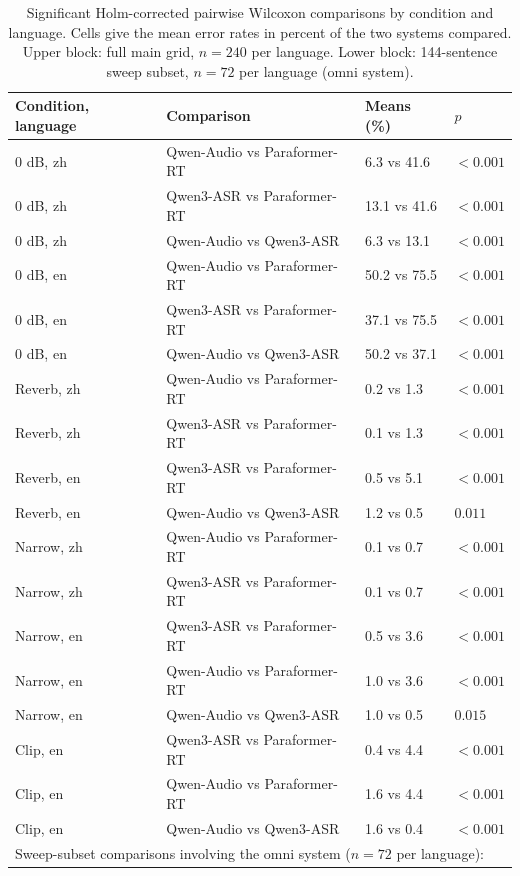 \documentclass[11pt]{article}
\begin{document}
\begin{table}[h]
\centering
\caption{Significant Holm-corrected pairwise Wilcoxon comparisons by
condition and language. Cells give the mean error rates in percent of the
two systems compared. Upper block: full main grid, $n{=}240$ per language.
Lower block: 144-sentence sweep subset, $n{=}72$ per language (omni
system).}\label{tab:pairwise}
\small
\setlength{\tabcolsep}{4pt}
\begin{tabular}{llll}
\toprule
Condition, language & Comparison & Means (\%) & $p$ \\
\midrule
0 dB, zh & Qwen-Audio vs Paraformer-RT & 6.3 vs 41.6 & $<0.001$ \\
0 dB, zh & Qwen3-ASR vs Paraformer-RT & 13.1 vs 41.6 & $<0.001$ \\
0 dB, zh & Qwen-Audio vs Qwen3-ASR & 6.3 vs 13.1 & $<0.001$ \\
0 dB, en & Qwen-Audio vs Paraformer-RT & 50.2 vs 75.5 & $<0.001$ \\
0 dB, en & Qwen3-ASR vs Paraformer-RT & 37.1 vs 75.5 & $<0.001$ \\
0 dB, en & Qwen-Audio vs Qwen3-ASR & 50.2 vs 37.1 & $<0.001$ \\
Reverb, zh & Qwen-Audio vs Paraformer-RT & 0.2 vs 1.3 & $<0.001$ \\
Reverb, zh & Qwen3-ASR vs Paraformer-RT & 0.1 vs 1.3 & $<0.001$ \\
Reverb, en & Qwen3-ASR vs Paraformer-RT & 0.5 vs 5.1 & $<0.001$ \\
Reverb, en & Qwen-Audio vs Qwen3-ASR & 1.2 vs 0.5 & $0.011$ \\
Narrow, zh & Qwen-Audio vs Paraformer-RT & 0.1 vs 0.7 & $<0.001$ \\
Narrow, zh & Qwen3-ASR vs Paraformer-RT & 0.1 vs 0.7 & $<0.001$ \\
Narrow, en & Qwen3-ASR vs Paraformer-RT & 0.5 vs 3.6 & $<0.001$ \\
Narrow, en & Qwen-Audio vs Paraformer-RT & 1.0 vs 3.6 & $<0.001$ \\
Narrow, en & Qwen-Audio vs Qwen3-ASR & 1.0 vs 0.5 & $0.015$ \\
Clip, en & Qwen3-ASR vs Paraformer-RT & 0.4 vs 4.4 & $<0.001$ \\
Clip, en & Qwen-Audio vs Paraformer-RT & 1.6 vs 4.4 & $<0.001$ \\
Clip, en & Qwen-Audio vs Qwen3-ASR & 1.6 vs 0.4 & $<0.001$ \\
\midrule
\multicolumn{4}{l}{\footnotesize Sweep-subset comparisons involving the omni system ($n{=}72$ per language):} \\

\end{tabular}
\end{table}
\end{document}
